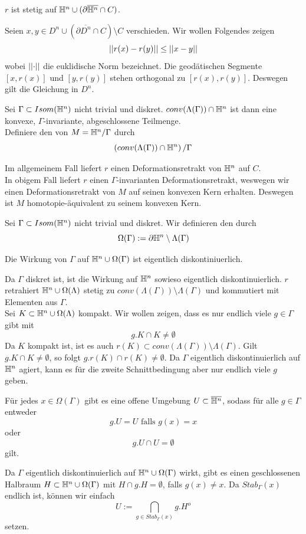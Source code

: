 \documentclass{book}
\begin{document}
\Lem{}
$r$ ist stetig auf $\mathbb{H}^n \cup (\partial \overline{\mathbb{H}^n} \cap C)$.
\begin{Beweis}{}
	Seien $x,y \in D^n \cup (\partial \overline{D^n} \cap C) \setminus C$ verschieden. Wir wollen Folgendes zeigen
	\[ \left|\left|r(x) - r(y)\right|\right| \leq \left|\left|x-y\right|\right| \]
	wobei $\left|\left|\cdot\right|\right|$ die euklidische Norm bezeichnet. Die geodätischen Segmente $[x,r(x)]$ und $[y,r(y)]$ stehen orthogonal zu $[r(x), r(y)]$. Deswegen gilt die Gleichung in $D^n$.
\end{Beweis}

\Def{}
Sei $\Gamma \subset Isom(\mathbb{H}^n)$ nicht trivial und diskret. $conv(\Lambda(\Gamma)) \cap \mathbb{H}^n$ ist dann eine konvexe, $\Gamma$-invariante, abgeschlossene Teilmenge.\\
Definiere den  von $M = \mathbb{H}^n / \Gamma$ durch
\[ \left(conv(\Lambda(\Gamma)) \cap \mathbb{H}^n\right) / \Gamma \]

\Bem{}
Im allgemeinem Fall liefert $r$ einen Deformationsretrakt von $\mathbb{H}^n$ auf $C$.\\
In obigem Fall liefert $r$ einen $\Gamma$-invarianten Deformationsretrakt, weswegen wir einen Deformationsretrakt von $M$ auf seinen konvexen Kern erhalten. Deswegen ist $M$ homotopie-äquivalent zu seinem konvexen Kern.


\Def{}
Sei $\Gamma \subset Isom(\mathbb{H}^n)$ nicht trivial und diskret. Wir definieren den  durch
\[ \Omega(\Gamma) := \partial \mathbb{H}^n \setminus \Lambda(\Gamma) \]

\Lem{}
Die Wirkung von $\Gamma$ auf $\mathbb{H}^n \cup \Omega(\Gamma)$ ist eigentlich diskontiniuerlich.
\begin{Beweis}{}
	Da $\Gamma$ diskret ist, ist die Wirkung auf $\mathbb{H}^n$ sowieso eigentlich diskontinuierlich. $r$ retrahiert $\mathbb{H}^n \cup \Omega(\Lambda)$ stetig zu $conv(\Lambda(\Gamma)) \setminus \Lambda(\Gamma)$ und kommutiert mit Elementen aus $\Gamma$.\\
	Sei $K \subset \mathbb{H}^n \cup \Omega(\Lambda)$ kompakt. Wir wollen zeigen, dass es nur endlich viele $g \in \Gamma$ gibt mit
	\[ g.K \cap K \neq \emptyset \]
	Da $K$ kompakt ist, ist es auch $r(K) \subset conv(\Lambda(\Gamma)) \setminus \Lambda(\Gamma)$. Gilt $g.K \cap K \neq \emptyset$, so folgt $g.r(K) \cap r(K) \neq \emptyset$. Da $\Gamma$ eigentlich diskontinuierlich auf $\mathbb{H}^n$ agiert, kann es für die zweite Schnittbedingung aber nur endlich viele $g$ geben.
\end{Beweis}

\Lem{}
Für jedes $x\in \Omega(\Gamma)$ gibt es eine offene Umgebung $U\subset \overline{\mathbb{H}^n}$, sodass für alle $g\in \Gamma$ entweder
\[ g.U = U \text{ falls } g(x) = x \]
oder
\[ g.U \cap U =\emptyset \]
gilt.
\begin{Beweis}{}
	Da $\Gamma$ eigentlich diskontinuierlich auf $\mathbb{H}^n\cup \Omega(\Gamma)$ wirkt, gibt es einen geschlossenen Halbraum $H \subset \mathbb{H}^n \cup \Omega(\Gamma)$ mit $H \cap g.H = \emptyset$, falls $g(x)\neq x$. Da $Stab_\Gamma(x)$ endlich ist, können wir einfach
	\[ U:= \bigcap_{g\in Stab_\Gamma(x)} g.H^o \]
	setzen.
\end{Beweis}
\end{document}
